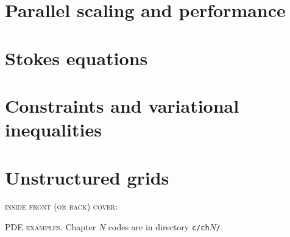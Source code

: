 \documentclass{tufte-book}
\newcommand{\CODELOC}{}  %
\newcommand{\stubinput}[2]{}
\newcommand{\stubinput}[2]{\vspace{5cm} \centerline{\LARGE Percent completed:  \Huge #2\%.} \vfill}
\theoremstyle{definition}
\begin{document}
\chapter{Parallel scaling and performance}
\label{chap:sc}
\renewcommand{\CODELOC}{ch10/}


\chapter{Stokes equations}
\label{chap:ok}
\renewcommand{\CODELOC}{ch11/}
\stubinput{chaps/stokes.tex}{5}
%

\chapter{Constraints and variational inequalities}
\label{chap:co}
\renewcommand{\CODELOC}{ch12/}


\chapter{Unstructured grids}
\label{chap:dp}
\renewcommand{\CODELOC}{ch13/}
\stubinput{chaps/dmplex.tex}{0}


\backmatter




\clearpage

\newcommand{\tblockeqncode}[3]{
\begin{tabular}[t]{l} #1 \\ \quad {\normalsize \texttt{#3}} \\ \qquad \fbox{\small #2} \end{tabular}
}
\newcommand{\tblockcode}[2]{
\begin{tabular}[t]{l} #1 \\ \quad {\normalsize \texttt{#2}} \end{tabular}
}
\newcommand{\tblock}[1]{
\begin{tabular}[t]{l} #1 \end{tabular}
}


\clearpage
\thispagestyle{empty}
\noindent \textsc{inside front (or back) cover:}

{\large \noindent \textsc{PDE examples}.} \quad Chapter $N$ codes are in directory \texttt{c/ch}$N$\texttt{/}.
\end{document}
